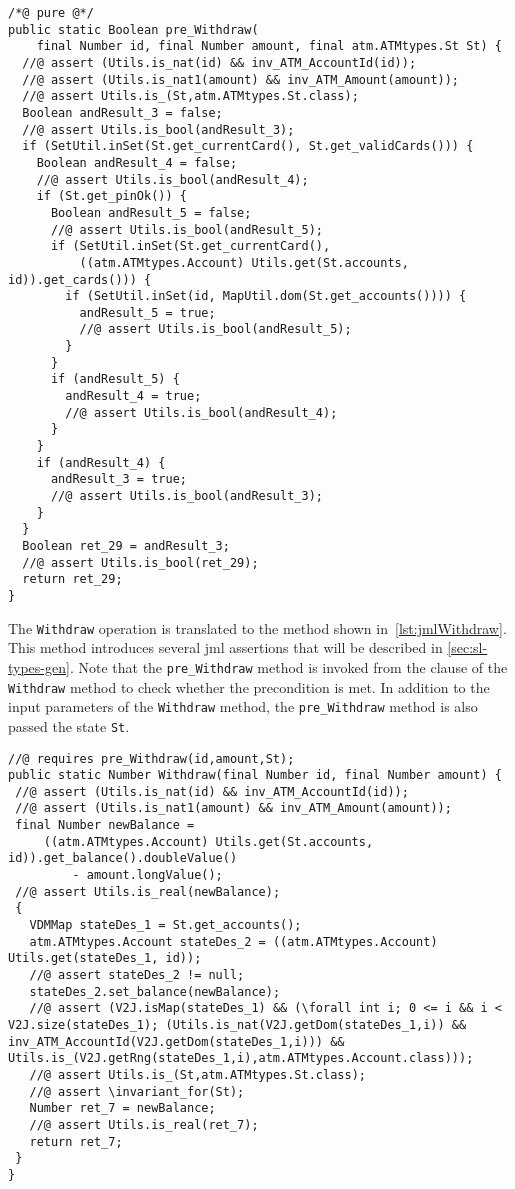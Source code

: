 \begin{lstlisting}[float=*,style=customJml,caption={Code-generated version of
the \texttt{pre\_Withdraw} operation.},label={lst:jmlPreWithdraw}]
/*@ pure @*/
public static Boolean pre_Withdraw(
    final Number id, final Number amount, final atm.ATMtypes.St St) {
  //@ assert (Utils.is_nat(id) && inv_ATM_AccountId(id));
  //@ assert (Utils.is_nat1(amount) && inv_ATM_Amount(amount));
  //@ assert Utils.is_(St,atm.ATMtypes.St.class);
  Boolean andResult_3 = false;
  //@ assert Utils.is_bool(andResult_3);
  if (SetUtil.inSet(St.get_currentCard(), St.get_validCards())) {
    Boolean andResult_4 = false;
    //@ assert Utils.is_bool(andResult_4);
    if (St.get_pinOk()) {
      Boolean andResult_5 = false;
      //@ assert Utils.is_bool(andResult_5);
      if (SetUtil.inSet(St.get_currentCard(),
          ((atm.ATMtypes.Account) Utils.get(St.accounts, id)).get_cards())) {
        if (SetUtil.inSet(id, MapUtil.dom(St.get_accounts()))) {
          andResult_5 = true;
          //@ assert Utils.is_bool(andResult_5);
        }
      }
      if (andResult_5) {
        andResult_4 = true;
        //@ assert Utils.is_bool(andResult_4);
      }
    }
    if (andResult_4) {
      andResult_3 = true;
      //@ assert Utils.is_bool(andResult_3);
    }
  }
  Boolean ret_29 = andResult_3;
  //@ assert Utils.is_bool(ret_29);
  return ret_29;
}
\end{lstlisting}

The \texttt{Withdraw} operation is translated to the method shown
in~\autoref{lst:jmlWithdraw}. This method introduces several \ac{jml}
assertions that will be described in \autoref{sec:sl-types-gen}. Note
that the \texttt{pre\_Withdraw} method is invoked from the
 clause of the \texttt{Withdraw} method to check whether
the precondition is met. In addition to the input parameters of the
\texttt{Withdraw} method, the \texttt{pre\_Withdraw} method is also
passed the state \texttt{St}.

\begin{lstlisting}[float=*,style=customJml,caption={Code-generated version of
the \texttt{Withdraw} operation.},label={lst:jmlWithdraw}]
//@ requires pre_Withdraw(id,amount,St);
public static Number Withdraw(final Number id, final Number amount) {
 //@ assert (Utils.is_nat(id) && inv_ATM_AccountId(id));
 //@ assert (Utils.is_nat1(amount) && inv_ATM_Amount(amount));
 final Number newBalance =
     ((atm.ATMtypes.Account) Utils.get(St.accounts, id)).get_balance().doubleValue()
         - amount.longValue();
 //@ assert Utils.is_real(newBalance);
 {
   VDMMap stateDes_1 = St.get_accounts();
   atm.ATMtypes.Account stateDes_2 = ((atm.ATMtypes.Account) Utils.get(stateDes_1, id));
   //@ assert stateDes_2 != null;
   stateDes_2.set_balance(newBalance);
   //@ assert (V2J.isMap(stateDes_1) && (\forall int i; 0 <= i && i < V2J.size(stateDes_1); (Utils.is_nat(V2J.getDom(stateDes_1,i)) && inv_ATM_AccountId(V2J.getDom(stateDes_1,i))) && Utils.is_(V2J.getRng(stateDes_1,i),atm.ATMtypes.Account.class)));
   //@ assert Utils.is_(St,atm.ATMtypes.St.class);
   //@ assert \invariant_for(St);
   Number ret_7 = newBalance;
   //@ assert Utils.is_real(ret_7);
   return ret_7;
 }
}
\end{lstlisting}

